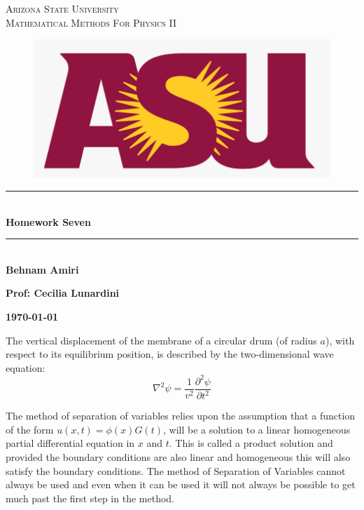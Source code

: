 \documentclass[fleqn]{article}
\begin{document}
  \begin{titlepage}

    \newcommand{\HRule}{\rule{\linewidth}{0.5mm}}

    \center


    \textsc{\LARGE Arizona State University}\\[1.5cm]

    \textsc{\LARGE Mathematical Methods For Physics II }\\[1.5cm]


    \begin{figure}
      \includegraphics[width=\linewidth]{asu.png}
    \end{figure}


    \HRule \\[0.4cm]
    { \huge \bfseries Homework Seven}\\[0.4cm] 
    \HRule \\[1.5cm]

    \textbf{Behnam Amiri}

    \bigbreak

    \textbf{Prof: Cecilia Lunardini}

    \bigbreak


    \textbf{{\large \today}\\[2cm]}

    \vfill

  \end{titlepage}

  The vertical displacement of the membrane of a circular drum (of radius $a$), with respect to its equilibrium position, is described by the two-dimensional wave equation: 
  $$
  \nabla^2 \psi = \frac{1}{v^2} \frac{\partial ^2 \psi}{\partial t^2}
  $$

  \textcolor{hwColor}{
    The method of separation of variables relies upon the assumption that a function of the form $u(x,t)=\phi(x) G(t)$, 
    will be a solution to a linear homogeneous partial differential equation in $x$ and $t$. This is called a product solution
    and provided the boundary conditions are also linear and homogeneous this will also satisfy the boundary conditions.
    The method of Separation of Variables cannot always be used and even when it can be used 
    it will not always be possible to get much past the first step in the method. \\
  }
\end{document}
